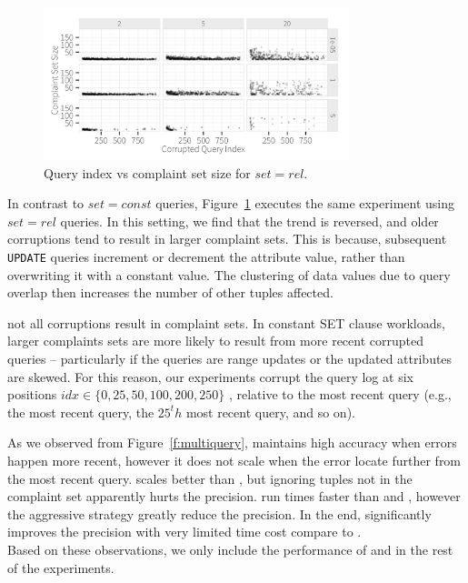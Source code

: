 {\begin{figure}[h]
\centering
\includegraphics[width = 3.5in]{figures/qidxsimulation/qidx_v_ncomplaints_20attrs_rel}
\caption{Query index vs complaint set size for $set = rel$.}
\label{f:qidx_v_ncomplaints_rel} 
\end{figure}

In contrast to $set=const$ queries, Figure~\ref{f:qidx_v_ncomplaints_rel} executes the 
same experiment using $set=rel$ queries.  In this setting, we find that the trend is
reversed, and older corruptions tend to result in larger complaint sets.  This is because,
subsequent \texttt{UPDATE} queries increment or decrement the attribute value, rather than
overwriting it with a constant value.  The clustering of data values due to query overlap
then increases the number of other tuples affected.


not all corruptions result in complaint sets.
In constant SET clause workloads, larger complaints sets are more likely to
result from more recent corrupted queries -- particularly if the queries are range updates or
the updated attributes are skewed.
For this reason, our experiments corrupt the query log at six positions 
$idx \in \{0, 25, 50, 100, 200, 250\}$ , relative 
to the most recent query (e.g., the most recent query, the $25^th$ most recent query, and so on).



As we observed from Figure~\ref{f:multiquery}, \milpall maintains high accuracy when errors
happen more recent, however it does not scale when the error locate further from the most
recent query. \milptuple scales better than \milpall, but ignoring tuples not 
in the complaint set apparently hurts the precision. \milptuplestopearly run times faster
than \milpall and \milptuple, however the aggressive strategy greatly reduce the 
precision. In the end, \milpadvtuple significantly improves the precision with very limited
time cost compare to \milptuple. \\
Based on these observations, we only include the performance of \milpadvtuple and \milpadvall
in the rest of the experiments. 

}
